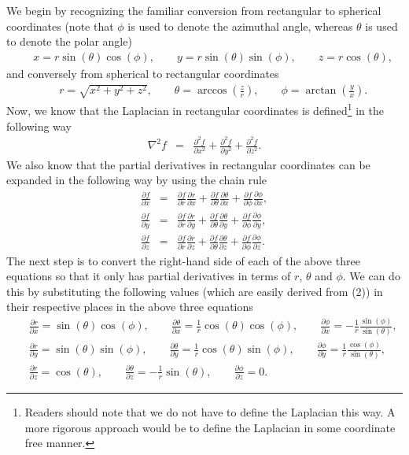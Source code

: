 \documentclass[12pt]{article}
\begin{document}
We begin by recognizing the familiar conversion from rectangular to spherical coordinates (note that $\phi$ is used to denote the azimuthal angle, whereas $\theta$ is used to denote the polar angle)
\begin{eqnarray}
& & x = r\sin(\theta)\cos(\phi), \qquad y = r\sin(\theta)\sin(\phi), \qquad z = r\cos(\theta),
\end{eqnarray}
and conversely from spherical to rectangular coordinates
\begin{eqnarray}
& & r = \sqrt{x^{2}+y^{2}+z^{2}}, \qquad \theta = \arccos\left(\frac{z}{r}\right), \qquad \phi = \arctan\left(\frac{y}{x}\right).
\end{eqnarray}
Now, we know that the Laplacian in rectangular coordinates is defined\footnote[1]{Readers should note that we do not have to define the Laplacian this way. A more rigorous approach would be to define the Laplacian in some coordinate free manner.} in the following way 
\begin{eqnarray}
{\nabla}^2 f &=& \frac{{\partial}^2 f}{\partial x^2} + \frac{{\partial}^2 f}{\partial y^2} + \frac{{\partial}^2 f}{\partial z^2}.
\end{eqnarray}
We also know that the partial derivatives in rectangular coordinates can be expanded in the following way by using the chain rule
\begin{eqnarray}
\frac{\partial f}{\partial x} &=& \frac{\partial f}{\partial r}\frac{\partial r}{\partial x}+ \frac{\partial f}{\partial\theta}\frac{\partial\theta}{\partial x} + \frac{\partial f}{\partial\phi}\frac{\partial\phi}{\partial x},\\
\frac{\partial f}{\partial y} &=& \frac{\partial f}{\partial r}\frac{\partial r}{\partial y}+ \frac{\partial f}{\partial\theta}\frac{\partial\theta}{\partial y} + \frac{\partial f}{\partial\phi}\frac{\partial\phi}{\partial y},\\
\frac{\partial f}{\partial z} &=& \frac{\partial f}{\partial r}\frac{\partial r}{\partial z}+ \frac{\partial f}{\partial\theta}\frac{\partial\theta}{\partial z} + \frac{\partial f}{\partial\phi}\frac{\partial\phi}{\partial z}.
\end{eqnarray}
The next step is to convert the right-hand side of each of the above three equations so that it only has partial derivatives in terms of $r$, $\theta$ and $\phi$. We can do this by substituting the following values (which are easily derived from (2)) in their respective places in the above three equations
\begin{eqnarray}
& & \frac{\partial r}{\partial x} = \sin(\theta)\cos(\phi), \qquad \frac{\partial\theta}{\partial x} = \frac{1}{r}\cos(\theta)\cos(\phi), \qquad \frac{\partial\phi}{\partial x} = -\frac{1}{r}\frac{\sin(\phi)}{\sin(\theta)}, \nonumber\\
& & \frac{\partial r}{\partial y} = \sin(\theta)\sin(\phi), \qquad \frac{\partial\theta}{\partial y} = \frac{1}{r}\cos(\theta)\sin(\phi), \qquad \frac{\partial\phi}{\partial y} = \frac{1}{r}\frac{\cos(\phi)}{\sin(\theta)}, \nonumber\\
& & \frac{\partial r}{\partial z} = \cos(\theta), \qquad \frac{\partial\theta}{\partial z} = -\frac{1}{r}\sin(\theta), \qquad \frac{\partial\phi}{\partial z} = 0.
\end{eqnarray}
\end{document}
